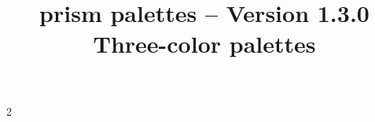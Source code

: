 \documentclass{tutodoc}
\title{\raisebox{-.20ex}{@}prism palettes -- Version 1.3.0\\ Three-color palettes}
\date{}
\begin{document}
\maketitle{}

{
  \setlength{\columnsep}{2cm}
  \setlength{\columnseprule}{0.4pt}

  \begin{multicols}{2}
    \tableofcontents
  \end{multicols}
}

\newpage


















\end{document}
